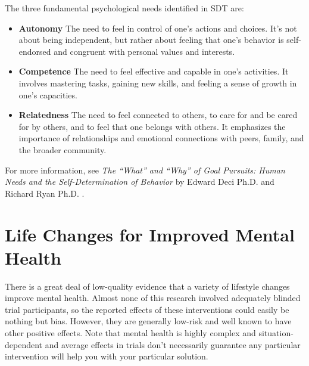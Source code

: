 \documentclass[12pt,letterpaper]{book}
\begin{document}
The three fundamental psychological needs identified in SDT are:
\begin{itemize}
    \item \textbf{Autonomy} The need to feel in control of one's actions and choices. It's not about being independent, but rather about feeling that one's behavior is self-endorsed and congruent with personal values and interests.
    \item \textbf{Competence} The need to feel effective and capable in one's activities. It involves mastering tasks, gaining new skills, and feeling a sense of growth in one's capacities.
    \item \textbf{Relatedness} The need to feel connected to others, to care for and be cared for by others, and to feel that one belongs with others. It emphasizes the importance of relationships and emotional connections with peers, family, and the broader community.
\end{itemize}
For more information, see \textit{The “What” and “Why” of Goal Pursuits: Human Needs and the Self-Determination of Behavior} by Edward Deci Ph.D. and Richard Ryan Ph.D. \cite{deciSDT}.
\chapter{Life Changes for Improved Mental Health}
\label{sec:lifechanges}
There is a great deal of low-quality evidence that a variety of lifestyle changes improve mental health. Almost none of this research involved adequately blinded trial participants, so the reported effects of these interventions could easily be nothing but bias. However, they are generally low-risk and well known to have other positive effects. Note that mental health is highly complex and situation-dependent and average effects in trials don't necessarily guarantee any particular intervention will help you with your particular solution.
\end{document}
